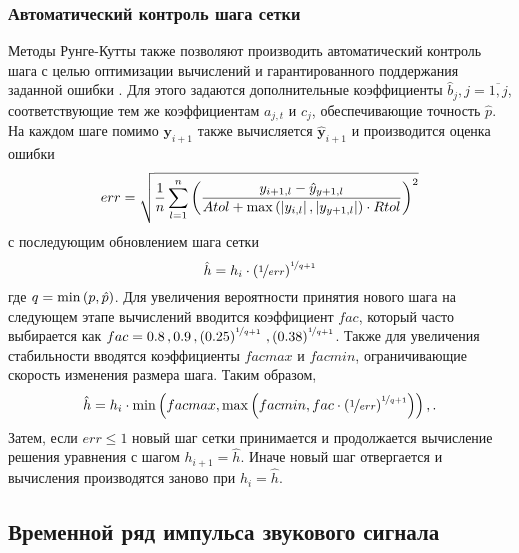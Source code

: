\documentclass[../document.tex]{subfiles}
\begin{document}
			\subsubsection{Автоматический контроль шага сетки}
				\par Методы Рунге-Кутты также позволяют производить автоматический контроль шага с целью оптимизации вычислений и гарантированного поддержания заданной ошибки \cite{dense}. Для этого задаются дополнительные коэффициенты $\hat{b}_j, j=\overline{1,j}$, соответствующие тем же коэффициентам $a_{j,t}$ и $c_j$, обеспечивающие точность $\hat{p}$. На каждом шаге помимо $\boldsymbol{y}_{i+1}$ также вычисляется $\boldsymbol{\hat{y}}_{i+1}$ и производится оценка ошибки
				\begin{equation}
					err=\sqrt{\frac{1}{n}\sum\limits_{l=1}^n\left(\frac{y_{i+1,l}-\hat{y}_{y+1,l}}{Atol+\max\left(\left|y_{i,l}\right|, \left|y_{y+1,l}\right|\right)\cdot Rtol}\right)^2}
				\end{equation}
				с последующим обновлением шага сетки
				\begin{equation}
					\hat{h}=h_i\cdot\left(\nicefrac{1}{err}\right)^{\nicefrac{1}{q+1}}
				\end{equation}
				где $q=\min\left(p,\hat{p}\right)$. Для увеличения вероятности принятия нового шага на следующем этапе вычислений вводится коэффициент $fac$, который часто выбирается как $fac=0.8\,,0.9\,,\left(0.25\right)^{\nicefrac{1}{q+1}}\,,\left(0.38\right)^{\nicefrac{1}{q+1}}$. Также для увеличения стабильности вводятся коэффициенты $facmax$ и $facmin$, ограничивающие скорость изменения размера шага. Таким образом,
				\begin{equation}
					\hat{h}=h_i\cdot\min\left(facmax,\max\left(facmin,fac\cdot\left(\nicefrac{1}{err}\right)^{\nicefrac{1}{q+1}}\right)\right),.
				\end{equation}
				Затем, если $err\leqslant1$ новый шаг сетки принимается и продолжается вычисление решения уравнения с шагом $h_{i+1}=\hat{h}$. Иначе новый шаг отвергается и вычисления производятся заново при $h_i=\hat{h}$.
		\subsection{Временной ряд импульса звукового сигнала}
\end{document}
